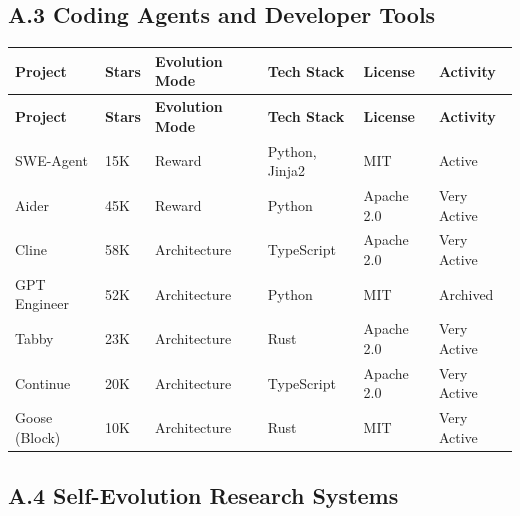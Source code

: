 \subsection*{A.3 Coding Agents and Developer Tools}

\begin{longtable}{p{28mm}p{12mm}p{24mm}p{18mm}p{14mm}p{14mm}}
\toprule
\textbf{Project} & \textbf{Stars} & \textbf{Evolution Mode} & \textbf{Tech Stack} & \textbf{License} & \textbf{Activity} \\
\midrule
\endfirsthead
\toprule
\textbf{Project} & \textbf{Stars} & \textbf{Evolution Mode} & \textbf{Tech Stack} & \textbf{License} & \textbf{Activity} \\
\midrule
\endhead

SWE-Agent & 15K & Reward & Python, Jinja2 & MIT & Active \\
Aider & 45K & Reward & Python & Apache 2.0 & Very Active \\
Cline & 58K & Architecture & TypeScript & Apache 2.0 & Very Active \\
GPT Engineer & 52K & Architecture & Python & MIT & Archived \\
Tabby & 23K & Architecture & Rust & Apache 2.0 & Very Active \\
Continue & 20K & Architecture & TypeScript & Apache 2.0 & Very Active \\
Goose (Block) & 10K & Architecture & Rust & MIT & Very Active \\
\bottomrule
\end{longtable}

\subsection*{A.4 Self-Evolution Research Systems}

